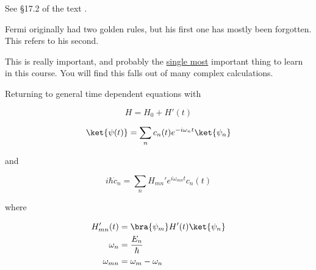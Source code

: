 

See \S 17.2 of the text \citep{desai2009quantum}.

Fermi originally had two golden rules, but his first one has mostly been forgotten.  This refers to his second.

This is really important, and probably the \underline{single most} important thing to learn in this course.  You will find this falls out of many complex calculations.

Returning to general time dependent equations with

\begin{equation}\label{eqn:qmTwoL9:330}
H = H_0 + H'(t)
\end{equation}

\begin{equation}\label{eqn:qmTwoL9:350}
\ket{\psi(t)} = \sum_n c_n(t) e^{-i\omega_n t} \ket{\psi_n}
\end{equation}

and 

\begin{equation}\label{eqn:qmTwoL9:370}
i \hbar \dot{c}_n = \sum_n H_{mn}' e^{i \omega_{mn} t} c_n(t)
\end{equation}

where

\begin{align}\label{eqn:qmTwoL9:390}
H_{mn}'(t) &= \bra{\psi_m} H'(t) \ket{\psi_n} \\
\omega_n &= \frac{E_n}{\hbar} \\
\omega_{mn} &= \omega_m - \omega_n
\end{align}

